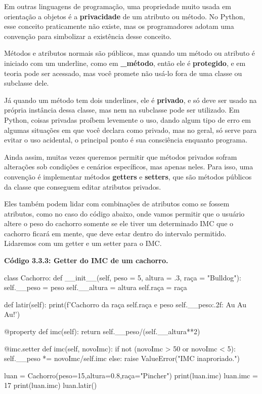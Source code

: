 \documentclass[11pt, a4paper]{article}
\begin{document}
Em outras linguagens de programação, uma propriedade muito usada em orientação a objetos é a \textbf{privacidade} de um atributo ou método. No Python, esse conceito praticamente não existe, mas os programadores adotam uma convenção para simbolizar a existência desse conceito.

Métodos e atributos normais são públicos, mas quando um método ou atributo é iniciado com um underline, como em \textbf{\_método}, então ele é \textbf{protegido}, e em teoria pode ser acessado, mas você promete não usá-lo fora de uma classe ou subclasse dele.

Já quando um método tem dois underlines, ele é \textbf{privado}, e só deve ser usado na própria instância dessa classe, mas nem na subclasse pode ser utilizado. Em Python, coisas privadas proíbem levemente o uso, dando algum tipo de erro em algumas situações em que você declara como privado, mas no geral, só serve para evitar o uso acidental, o principal ponto é sua consciência enquanto programa.

Ainda assim, muitas vezes queremos permitir que métodos privados sofram alterações sob condições e cenários específicos, mas apenas neles. Para isso, uma convenção é implementar métodos \textbf{getters} e \textbf{setters}, que são métodos públicos da classe que conseguem editar atributos privados.

Eles também podem lidar com combinações de atributos como se fossem atributos, como no caso do código abaixo, onde vamos permitir que o usuário altere o peso do cachorro somente se ele tiver um determinado IMC que o cachorro ficará em mente, que deve estar dentro do intervalo permitido. Lidaremos com um getter e um setter para o IMC.

\textbf{Código 3.3.3: Getter do IMC de um cachorro.}

\begin{code}
class Cachorro:
    def __init__(self, peso = 5, altura = .3, raça = "Bulldog"):
        self.__peso = peso
        self.__altura = altura 
        self.raça = raça
        
    def latir(self):
        print(f'Cachorro da raça {self.raça} e peso {self.__peso:.2f}: Au Au Au!')

    @property
    def imc(self):
        return self.__peso/(self.__altura**2)
    
    @imc.setter
    def imc(self, novoImc):
        if not (novoImc > 50 or novoImc < 5):
            self.__peso *= novoImc/self.imc
        else:
            raise ValueError("IMC inaproriado.")

luan = Cachorro(peso=15,altura=0.8,raça="Pincher")
print(luan.imc)
luan.imc = 17
print(luan.imc)
luan.latir()
\end{code}
\end{document}

